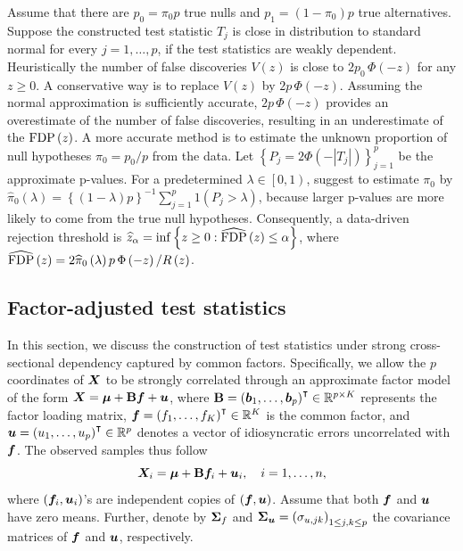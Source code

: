 Assume that there are $p_0=\pi_0p$ true nulls and $p_1=\left(1-\pi_0\right)p$ true alternatives. Suppose the constructed test statistic $T_j$ is close in distribution to standard normal for every $j=1,\ldots, p$, if the test statistics are weakly dependent. Heuristically the number of false discoveries $V\left(z\right)$ is close to $2 p_0 \, \Phi\left(-z\right)$ for any $z\geq 0$.
A conservative way is to replace $V\left(z\right)$ by $2p\, \Phi\left(-z\right)$. Assuming the normal approximation is sufficiently accurate, $2p\, \Phi\left(-z\right)$ provides an overestimate of the number of false discoveries, resulting in an underestimate of the $  {\rm FDP}\left(z\right)$. A more accurate method is to estimate the unknown proportion of null hypotheses $\pi_0 = p_0/p$ from the data. 
Let $\left\{  P_j = 2\Phi\left(-| T_j | \right) \right\}_{j=1}^p$ be the approximate p-values. For a predetermined $\lambda \in \left[0,1\right)$, \cite{S2002} suggest to estimate $\pi_0$ by  $\hat{\pi}_0\left(\lambda\right) =  \left\{ \left(1-\lambda\right)p\right\}^{-1}\sum_{j=1}^p 1 \left( P_j  > \lambda  \right)$,
because larger p-values are more likely to  come from  the true null hypotheses.
Consequently, a data-driven rejection threshold is $\widehat z_\alpha = \inf \left\{ z\geq 0 : \widehat {{\rm FDP}}\left(z\right) \leq  \alpha  \right\}$, where $\widehat {{\rm FDP}}\left(z\right) = 2 \widehat{\pi}_0\left(\lambda\right)  p \, \Phi\left(-z\right) / R\left(z\right)$.


\subsection{Factor-adjusted test statistics}
In this section, we discuss the construction of test statistics under strong cross-sectional dependency captured by common factors.
Specifically, we allow the $p$ coordinates of $\bm{X}$ to be strongly correlated through an approximate factor model of the form $\bm{X}    = \bm{\mu} + \mathbf{B} \bm f + \bm{u}$, where $\mathbf{B} = \left(\bm{b}_1, \ldots, \bm{b}_p\right)^\intercal \in \mathbb{R}^{p\times K}$ represents the factor loading matrix, $\bm f =\left(f_1 ,\ldots, f_K \right)^\intercal  \in \mathbb{R}^K$ is the common factor, and $\bm{u} = \left(u_1  , \ldots, u_p \right)^\intercal \in \mathbb{R}^p$ denotes a vector of idiosyncratic errors uncorrelated with $\bm f$. The observed samples thus follow
\begin{equation}\label{factor_model}
  \bm{X}_i   = \bm{\mu} + \mathbf{B} \bm f_i + \bm{u}_i, ~~~ i=1, \ldots , n,
\end{equation}	
where $\left(\bm f_i, \bm{u}_i\right)$'s are independent copies of $\left(\bm f, \bm{u}\right)$. Assume that both $\bm f $ and $\bm{u}$ have zero means.
Further, denote by $\bm{\Sigma}_f$ and $\bm{\Sigma}_{\bm{u}}=\left(\sigma_{u, jk}\right)_{1\leq  j, k\leq p}$ the  covariance matrices of $\bm f$ and $\bm{u}$, respectively.

